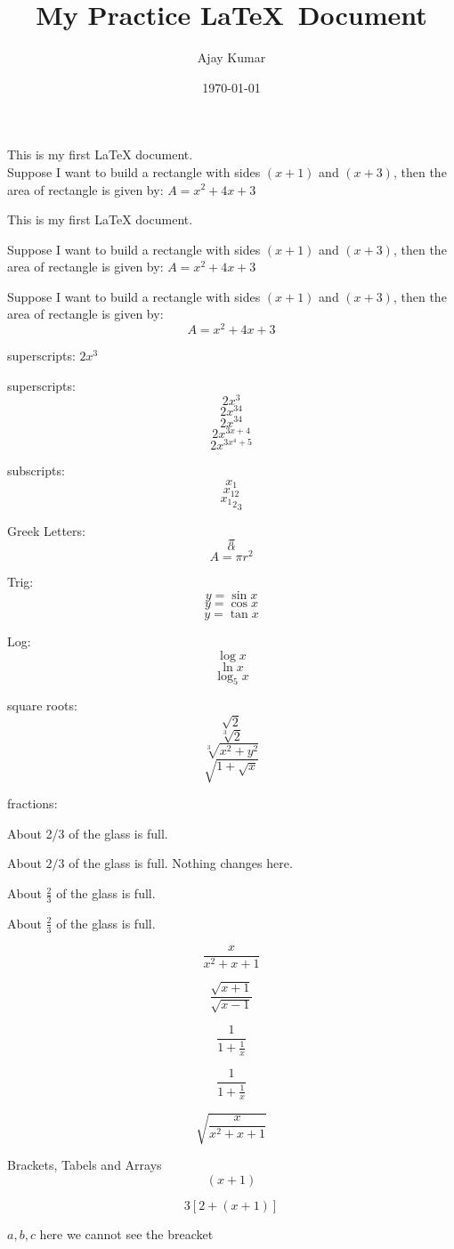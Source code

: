 \documentclass[11pt]{article}
\begin{document}
\tableofcontents

\title{My Practice \LaTeX \ Document}
\author{Ajay Kumar}
\date{\today}
\maketitle

This is my first LaTeX document.\\
Suppose I want to build a rectangle with sides
$(x+1)$ and $(x+3)$, then the area of rectangle is given by: $A = x^2+4x+3$

This is my first LaTeX document.


Suppose I want to build a rectangle with sides
$(x+1)$ and $(x+3)$, then the area of rectangle is given by: $A = x^2+4x+3$

Suppose I want to build a rectangle with sides
$(x+1)$ and $(x+3)$, then the area of rectangle is given by: $$A = x^2+4x+3$$

superscripts: $2x^3$

superscripts: $$2x^3$$
$$2x^34$$
$$2x^{34}$$
$$2x^{3x+4}$$
$$2x^{3x^4+5}$$

subscripts: $$x_1$$
$$x_{12}$$
$${{x_1}_2}_3$$

Greek Letters:
$$\pi$$
$$\alpha$$
$$A = \pi r^2$$

Trig:
$$y = \sin{x}$$
$$y = \cos{x}$$
$$y = \tan{x}$$

Log:
$$\log{x}$$
$$\ln{x}$$
$$\log_5{x}$$

square roots:
$$\sqrt{2}$$
$$\sqrt[3]{2}$$
$$\sqrt[3]{x^2+y^2}$$
$$\sqrt{1+\sqrt{x}}$$

fractions:

About 2/3 of the glass is full.

About $2/3$ of the glass is full. Nothing changes here.

About $\frac{2}{3}$ of the glass is full.

About $\displaystyle{\frac{2}{3}}$ of the glass is full.

$$\frac{x}{x^2+x+1}$$

$$\frac{\sqrt{x+1}}{\sqrt{x-1}}$$

$$\frac{1}{1+\frac{1}{x}}$$

$$\frac{1}{1+\displaystyle{\frac{1}{x}}}$$

$$\sqrt{\frac{x}{x^2+x+1}}$$

Brackets, Tabels and Arrays
$$(x+1)$$

$$3[2+(x+1)]$$

${a,b,c}$ here we cannot see the breacket
\end{document}
